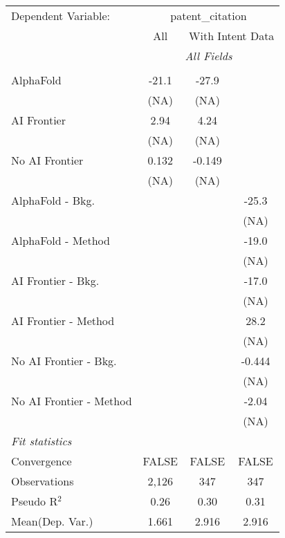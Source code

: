 \begingroup
\centering
\begin{tabular}{lccc}
   \tabularnewline \midrule \midrule
   Dependent Variable: & \multicolumn{3}{c}{patent\_citation}\\
 & \multicolumn{1}{c}{All} & \multicolumn{2}{c}{With Intent Data} \\
\cmidrule(lr){2-2} \cmidrule(lr){3-4}
 & \multicolumn{3}{c}{\textit{All Fields}} \\ \\
   AlphaFold               & -21.1 & -27.9  &   \\   
                           & (NA)  & (NA)   &   \\   
   AI Frontier             & 2.94  & 4.24   &   \\   
                           & (NA)  & (NA)   &   \\   
   No AI Frontier          & 0.132 & -0.149 &   \\   
                           & (NA)  & (NA)   &   \\   
   AlphaFold - Bkg.        &       &        & -25.3\\   
                           &       &        & (NA)\\   
   AlphaFold - Method      &       &        & -19.0\\   
                           &       &        & (NA)\\   
   AI Frontier - Bkg.      &       &        & -17.0\\   
                           &       &        & (NA)\\   
   AI Frontier - Method    &       &        & 28.2\\   
                           &       &        & (NA)\\   
   No AI Frontier - Bkg.   &       &        & -0.444\\   
                           &       &        & (NA)\\   
   No AI Frontier - Method &       &        & -2.04\\   
                           &       &        & (NA)\\   
   \midrule
   \emph{Fit statistics}\\
   Convergence             &FALSE  & FALSE  & FALSE\\  
   Observations            & 2,126 & 347    & 347\\  
   Pseudo R$^2$            & 0.26  & 0.30   & 0.31\\  
Mean(Dep. Var.) & 1.661 & 2.916 & 2.916 \\
   

\end{tabular}
